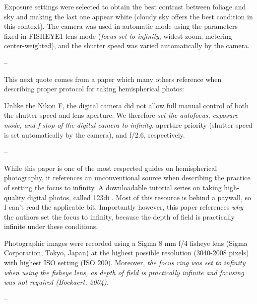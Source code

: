 \documentclass{article}
\begin{document}
\begin{minipage}{\linewidth}
\begin{framed}
Exposure settings were selected to obtain the best contrast between foliage and sky and making the last one appear white (cloudy sky offers the best condition in this context). The camera was used in automatic mode using the parameters fixed in FISHEYE1 lens mode (\textit{focus set to infinity}, widest zoom, metering center-weighted), and the shutter speed was varied automatically by the camera.

-- \citealt{Paletto2009}
\end{framed}
\end{minipage}

This next quote comes from a paper which many others reference when describing proper protocol for taking hemispherical photos: 

\begin{minipage}{\linewidth}
\begin{framed}
Unlike the Nikon F, the digital camera did not allow full manual control of both the shutter speed and lens aperture. We therefore \textit{set the autofocus, exposure mode, and f-stop of the digital camera to infinity}, aperture priority (shutter speed is set automatically by the camera), and f/2.6, respectively. 

-- \citealt{Frazer2001}
\end{framed}
\end{minipage}

While this paper is one of the most respected guides on hemispherical photography, it references an unconventional source when describing the practice of setting the focus to infinity. A downloadable tutorial series on taking high-quality digital photos, called 123di \citep{}. Most of this resource is behind a paywall, so I can't read the applicable bit. Importantly however, this paper references \textit{why} the authors set the focus to infinity, because the depth of field is practically infinite under these conditions.

\begin{minipage}{\linewidth}
\begin{framed}
Photographic images were recorded using a Sigma 8 mm f/4 fisheye lens (Sigma Corporation, Tokyo, Japan) at the highest possible resolution (3040-2008 pixels) with highest ISO setting (ISO 200). Moreover, \textit{the focus ring was set to infinity when using the fisheye lens, as depth of field is practically infinite and focusing was not required (Bockaert, 2004).}

-- \citealt{Jonckheere2005}
\end{framed}
\end{minipage}
\end{document}

